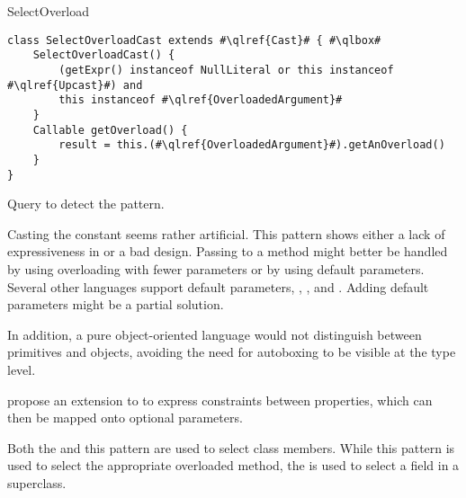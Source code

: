 \begin{pattern}{SelectOverload}
\begin{listing}
\begin{verbatim}
class SelectOverloadCast extends #\qlref{Cast}# { #\qlbox#
	SelectOverloadCast() {
		(getExpr() instanceof NullLiteral or this instanceof #\qlref{Upcast}#) and
		this instanceof #\qlref{OverloadedArgument}#
	}
	Callable getOverload() {
		result = this.(#\qlref{OverloadedArgument}#).getAnOverload()
	}
}
\end{verbatim}
\caption{Query to detect the \thisp{} pattern.}
\label{lst:ql:SelectOverloadCast}
\end{listing}

\issues{}
Casting the  constant seems rather artificial.
This pattern shows either a lack of expressiveness in \java{} or a bad \api{} design.
Passing  to a method might better be handled by using overloading with fewer parameters or by using default parameters.
Several other languages support default parameters,
\eg, \scala{}, \csharp{} and \cpp{}.
Adding default parameters might be a partial solution.

In addition, a pure object-oriented language would not distinguish between primitives and objects,
avoiding the need for autoboxing to be visible at the type level.

\cite{oostvogelsStaticTypingComplex2018a} propose an extension to \typescript{} to express constraints between properties,
which can then be mapped onto optional parameters.

Both the  and this pattern are used to select class members.
While this pattern is used to select the appropriate overloaded method,
the  is used to select a field in a superclass.

\end{pattern}
